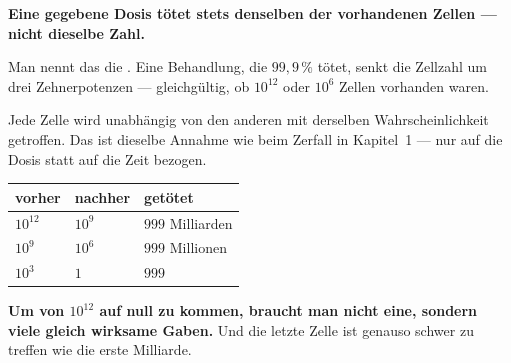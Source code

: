 \begin{merksatz}
\begin{center}
\begin{minipage}{0.9\textwidth}
\textbf{Eine gegebene Dosis tötet stets denselben  der vorhandenen Zellen --- nicht dieselbe Zahl.}
\end{minipage}
\end{center}

Man nennt das die . Eine Behandlung, die $99{,}9\,\%$ tötet, senkt die Zellzahl um drei Zehnerpotenzen --- gleichgültig, ob $10^{12}$ oder $10^{6}$ Zellen vorhanden waren.

Jede Zelle wird unabhängig von den anderen mit derselben Wahrscheinlichkeit getroffen. Das ist dieselbe Annahme wie beim Zerfall in Kapitel~1 --- nur auf die Dosis statt auf die Zeit bezogen.

\begin{center}
{\small
\renewcommand{\arraystretch}{1.48}
\begin{tabular}{@{}P{2.4cm}P{2.4cm}P{2.8cm}@{}}
\toprule
\textbf{vorher} & \textbf{nachher} & \textbf{getötet}\\
\midrule
$10^{12}$ & $10^{9}$ & $999$ Milliarden\\
$10^{9}$ & $10^{6}$ & $999$ Millionen\\
$10^{3}$ & $1$ & $999$\\
\bottomrule
\end{tabular}}
\end{center}

\begin{center}
\begin{minipage}{0.9\textwidth}
\textbf{Um von $10^{12}$ auf null zu kommen, braucht man nicht eine, sondern viele gleich wirksame Gaben.} Und die letzte Zelle ist genauso schwer zu treffen wie die erste Milliarde.
\end{minipage}
\end{center}

\begin{center}
\begin{minipage}{0.88\textwidth}
\end{minipage}
\end{center}
\end{merksatz}

